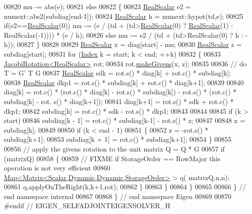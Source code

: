 \begin{DoxyCode}
00820     mu -= abs(e);
00821   \textcolor{keywordflow}{else}
00822   \{
00823     \hyperlink{group___eigenvalues___module_a5dae5f422a3c71060e6bd31332bf64fd}{RealScalar} e2 = numext::abs2(subdiag[end-1]);
00824     \hyperlink{group___eigenvalues___module_a5dae5f422a3c71060e6bd31332bf64fd}{RealScalar} h = numext::hypot(td,e);
00825     \textcolor{keywordflow}{if}(e2==\hyperlink{group___eigenvalues___module_a5dae5f422a3c71060e6bd31332bf64fd}{RealScalar}(0)) mu -= (e / (td + (td>\hyperlink{group___eigenvalues___module_a5dae5f422a3c71060e6bd31332bf64fd}{RealScalar}(0) ? 
      \hyperlink{group___eigenvalues___module_a5dae5f422a3c71060e6bd31332bf64fd}{RealScalar}(1) : RealScalar(-1)))) * (e / h);
00826     \textcolor{keywordflow}{else}                  mu -= e2 / (td + (td>RealScalar(0) ? h : -h));
00827   \}
00828   
00829   \hyperlink{group___eigenvalues___module_a5dae5f422a3c71060e6bd31332bf64fd}{RealScalar} x = diag[start] - mu;
00830   \hyperlink{group___eigenvalues___module_a5dae5f422a3c71060e6bd31332bf64fd}{RealScalar} z = subdiag[start];
00831   \textcolor{keywordflow}{for} (\hyperlink{group___eigenvalues___module_a8a59ab7734b6eae2754fd78bc7c3a360}{Index} k = start; k < end; ++k)
00832   \{
00833     \hyperlink{group___jacobi___module_class_eigen_1_1_jacobi_rotation}{JacobiRotation<RealScalar>} rot;
00834     rot.\hyperlink{group___jacobi___module_af73c81e9cc139b7e0d877ce553b02ec0}{makeGivens}(x, z);
00835 
00836     \textcolor{comment}{// do T = G' T G}
00837     \hyperlink{group___eigenvalues___module_a5dae5f422a3c71060e6bd31332bf64fd}{RealScalar} sdk = rot.s() * diag[k] + rot.c() * subdiag[k];
00838     \hyperlink{group___eigenvalues___module_a5dae5f422a3c71060e6bd31332bf64fd}{RealScalar} dkp1 = rot.s() * subdiag[k] + rot.c() * diag[k+1];
00839 
00840     diag[k] = rot.c() * (rot.c() * diag[k] - rot.s() * subdiag[k]) - rot.s() * (rot.c() * subdiag[k] - rot.
      s() * diag[k+1]);
00841     diag[k+1] = rot.s() * sdk + rot.c() * dkp1;
00842     subdiag[k] = rot.c() * sdk - rot.s() * dkp1;
00843     
00844 
00845     \textcolor{keywordflow}{if} (k > start)
00846       subdiag[k - 1] = rot.c() * subdiag[k-1] - rot.s() * z;
00847 
00848     x = subdiag[k];
00849 
00850     \textcolor{keywordflow}{if} (k < end - 1)
00851     \{
00852       z = -rot.s() * subdiag[k+1];
00853       subdiag[k + 1] = rot.c() * subdiag[k+1];
00854     \}
00855     
00856     \textcolor{comment}{// apply the givens rotation to the unit matrix Q = Q * G}
00857     \textcolor{keywordflow}{if} (matrixQ)
00858     \{
00859       \textcolor{comment}{// FIXME if StorageOrder == RowMajor this operation is not very efficient}
00860       \hyperlink{group___core___module_class_eigen_1_1_map}{Map<Matrix<Scalar,Dynamic,Dynamic,StorageOrder>} > q(
      matrixQ,n,n);
00861       q.applyOnTheRight(k,k+1,rot);
00862     \}
00863   \}
00864 \}
00865 
00866 \} \textcolor{comment}{// end namespace internal}
00867 
00868 \} \textcolor{comment}{// end namespace Eigen}
00869 
00870 \textcolor{preprocessor}{#endif // EIGEN\_SELFADJOINTEIGENSOLVER\_H}
\end{DoxyCode}
